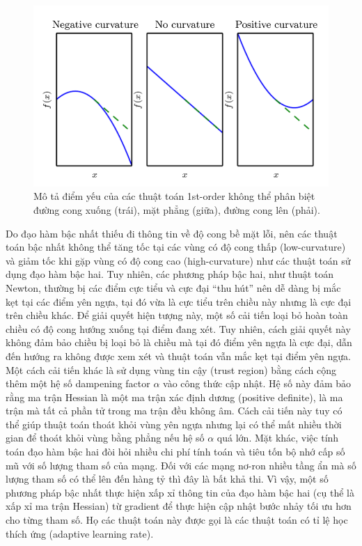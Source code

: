 \begin{figure}[htp]
\centering
\includegraphics[width=120 mm]{images/hessian.png}
\caption{Mô tả điểm yếu của các thuật toán 1st-order không thể phân biệt đường cong xuống (trái), mặt phẳng (giữa), đường cong lên (phải). \cite{goodfellow2016deeplearning}}
\label{fig:hessian}
\end{figure}

Do đạo hàm bậc nhất thiếu đi thông tin về độ cong bề mặt lỗi, nên các thuật toán bậc nhất không thể tăng tốc tại các vùng có độ cong thấp (low-curvature) và giảm tốc khi gặp vùng có độ cong cao (high-curvature) như các thuật toán sử dụng đạo hàm bậc hai. Tuy nhiên, các phương pháp bậc hai, như thuật toán Newton, thường bị các điểm cực tiểu và cực đại ``thu hút'' nên dễ dàng bị mắc kẹt tại các điểm yên ngựa, tại đó vừa là cực tiểu trên chiều này nhưng là cực đại trên chiều khác. Để giải quyết hiện tượng này, một số cải tiến loại bỏ hoàn toàn chiều có độ cong hướng xuống tại điểm đang xét. Tuy nhiên, cách giải quyết này không đảm bảo chiều bị loại bỏ là chiều mà tại đó điểm yên ngựa là cực đại, dẫn đến hướng ra không được xem xét và thuật toán vẫn mắc kẹt tại điểm yên ngựa. Một cách cải tiến khác là sử dụng vùng tin cậy (trust region) bằng cách cộng thêm một hệ số dampening factor $\alpha$ vào công thức cập nhật. Hệ số này đảm bảo rằng ma trận Hessian là một ma trận xác định dương (positive definite), là ma trận mà tất cả phần tử trong ma trận đều không âm. Cách cải tiến này tuy có thể giúp thuật toán thoát khỏi vùng yên ngựa nhưng lại có thể mất nhiều thời gian để thoát khỏi vùng bằng phẳng nếu hệ số $\alpha$ quá lớn. Mặt khác, việc tính toán đạo hàm bậc hai đòi hỏi nhiều chi phí tính toán và tiêu tốn bộ nhớ cấp số mũ với số lượng tham số của mạng. Đối với các mạng nơ-ron nhiều tầng ẩn mà số lượng tham số có thể lên đến hàng tỷ thì đây là bất khả thi. Vì vậy, một số phương pháp bậc nhất thực hiện xấp xỉ thông tin của đạo hàm bậc hai (cụ thể là xấp xỉ ma trận Hessian) từ gradient để thực hiện cập nhật bước nhảy tối ưu hơn cho từng tham số. Họ các thuật toán này được gọi là các thuật toán có tỉ lệ học thích ứng (adaptive learning rate).

